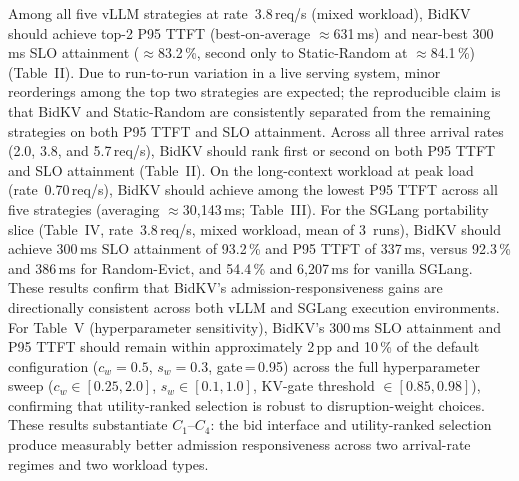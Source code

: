\documentclass[conference]{IEEEtran}
\begin{document}
\artexp

Among all five vLLM strategies at rate~3.8\,req/s (mixed workload), BidKV
should achieve top-2 P95 TTFT (best-on-average $\approx$631\,ms) and
near-best 300\,ms SLO attainment ($\approx$83.2\,\%, second only to
Static-Random at $\approx$84.1\,\%) (Table~II).
Due to run-to-run variation in a live serving system, minor reorderings
among the top two strategies are expected; the reproducible claim is that
BidKV and Static-Random are consistently separated from the remaining
strategies on both P95 TTFT and SLO attainment.
Across all three arrival rates (2.0, 3.8, and 5.7\,req/s), BidKV should
rank first or second on both P95 TTFT and SLO attainment (Table~II).
On the long-context workload at peak load (rate~0.70\,req/s), BidKV should
achieve among the lowest P95 TTFT across all five strategies
(averaging $\approx$30{,}143\,ms; Table~III).
For the SGLang portability slice (Table~IV, rate~3.8\,req/s, mixed workload,
mean of 3~runs), BidKV should achieve 300\,ms SLO attainment of 93.2\,\%
and P95 TTFT of 337\,ms, versus 92.3\,\% and 386\,ms for Random-Evict,
and 54.4\,\% and 6{,}207\,ms for vanilla SGLang.
These results confirm that BidKV's admission-responsiveness gains are
directionally consistent across both vLLM and SGLang execution
environments.
For Table~V (hyperparameter sensitivity), BidKV's 300\,ms SLO attainment
and P95 TTFT should remain within approximately 2\,pp and 10\,\% of the
default configuration ($c_w{=}0.5$, $s_w{=}0.3$, gate\,=\,0.95) across the
full hyperparameter sweep ($c_w \in [0.25, 2.0]$, $s_w \in [0.1, 1.0]$,
KV-gate threshold $\in [0.85, 0.98]$), confirming that utility-ranked
selection is robust to disruption-weight choices.
These results substantiate $C_1$--$C_4$: the bid interface and
utility-ranked selection produce measurably better admission responsiveness
across two arrival-rate regimes and two workload types.

\arttime
\end{document}
